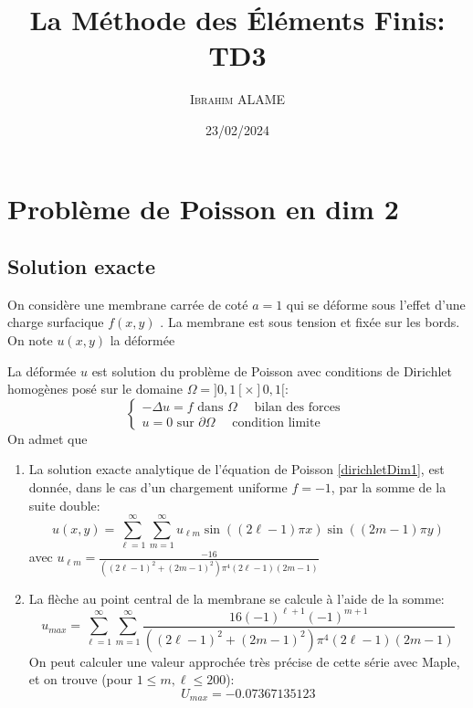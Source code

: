 \documentclass{article}
\title{La Méthode des Éléments Finis: TD3}
\author{ \textsc{Ibrahim ALAME}}
\date{23/02/2024}
\begin{document}
  \lstset{
    frame       = single,
    numbers     = left,
    showspaces  = false,
    showstringspaces    = false,
    captionpos  = t,
    caption     = \lstname
}
\maketitle
\section*{Problème de Poisson en dim 2}
\subsection*{Solution exacte}
On considère une membrane carrée de coté $a=1$ qui se déforme sous l'effet d'une charge surfacique $ f(x,y)$ . La membrane est sous tension et fixée sur les bords.  On note $ u(x,y)$ la déformée

\begin{center}
\end{center}

 La déformée $u$ est solution du problème de Poisson avec conditions de Dirichlet homogènes posé sur le domaine
$\Omega = ]0, 1[ \times ]0, 1[$: 
\begin{equation}
\left\{
\begin{array}{l}
-\Delta u = f \mbox{ dans } \Omega \quad \mbox{ bilan des forces }\\
u=0  \mbox{ sur } \partial \Omega \quad \mbox{ condition limite }
\end{array}
\right.
\label{dirichletDim1}
\end{equation}
On admet que
\begin{enumerate}
\item La solution exacte analytique de l'équation de Poisson \eqref{dirichletDim1}, est donnée,  dans le cas d'un chargement uniforme $f=-1$,  par la somme de la suite double:
\[u(x,y)=\sum_{\ell=1}^{\infty}\sum_{m=1}^{\infty}u_{\ell m}\sin((2\ell-1)\pi x)\sin((2m-1)\pi y)\]
avec  $\displaystyle u_{\ell m}=\frac{-16}{((2\ell-1)^{2}+(2m-1)^{2})\pi^{4}(2\ell-1)(2m-1)}$
\item La flèche au point central de la membrane se calcule à l'aide de la somme:
$$\displaystyle u_{max}=\sum_{\ell=1}^{\infty}\sum_{m=1}^{\infty}\frac{16(-1)^{\ell+1}(-1)^{m+1}}{((2\ell-1)^{2}+(2m-1)^{2})\pi^{4}(2\ell-1)(2m-1)}$$
On peut calculer une valeur approchée très précise de cette série avec Maple, et on trouve (pour $ 1\leq m,\ell \leq 200$):
\[\displaystyle U_{max}=-0.07367135123\]
\end{enumerate}
\end{document}
